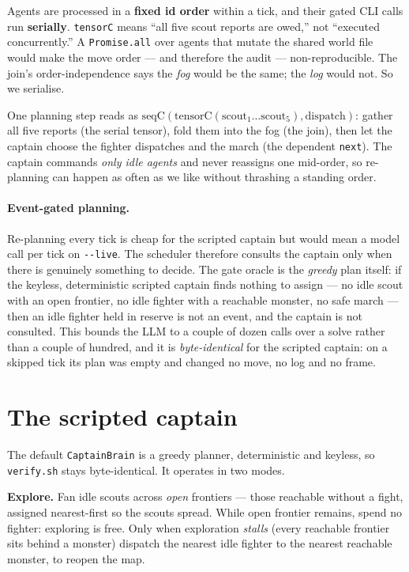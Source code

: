 \documentclass[11pt]{article}
\newcommand{\code}[1]{\texttt{#1}}
\begin{document}
\begin{keybox}
Agents are processed in a \textbf{fixed id order} within a tick, and their gated CLI
calls run \textbf{serially}. \code{tensorC} means ``all five scout reports are owed,''
not ``executed concurrently.'' A \code{Promise.all} over agents that mutate the shared
world file would make the move order --- and therefore the audit --- non-reproducible.
The join's order-independence says the \emph{fog} would be the same; the \emph{log}
would not. So we serialise.
\end{keybox}

One planning step reads as $\mathrm{seqC}(\mathrm{tensorC}(\text{scout}_1 \ldots
\text{scout}_5), \text{dispatch})$: gather all five reports (the serial tensor), fold
them into the fog (the join), then let the captain choose the fighter dispatches and
the march (the dependent \code{next}). The captain commands \emph{only idle agents} and
never reassigns one mid-order, so re-planning can happen as often as we like without
thrashing a standing order.

\paragraph{Event-gated planning.} Re-planning every tick is cheap for the scripted
captain but would mean a model call per tick on \code{-{}-live}. The scheduler therefore
consults the captain only when there is genuinely something to decide. The gate oracle
is the \emph{greedy} plan itself: if the keyless, deterministic scripted captain finds
nothing to assign --- no idle scout with an open frontier, no idle fighter with a
reachable monster, no safe march --- then an idle fighter held in reserve is not an
event, and the captain is not consulted. This bounds the LLM to a couple of dozen calls
over a solve rather than a couple of hundred, and it is \emph{byte-identical} for the
scripted captain: on a skipped tick its plan was empty and changed no move, no log and
no frame.

\section{The scripted captain}

The default \code{CaptainBrain} is a greedy planner, deterministic and keyless, so
\code{verify.sh} stays byte-identical. It operates in two modes.

\textbf{Explore.} Fan idle scouts across \emph{open} frontiers --- those reachable
without a fight, assigned nearest-first so the scouts spread. While open frontier
remains, spend no fighter: exploring is free. Only when exploration \emph{stalls}
(every reachable frontier sits behind a monster) dispatch the nearest idle fighter to
the nearest reachable monster, to reopen the map.
\end{document}
